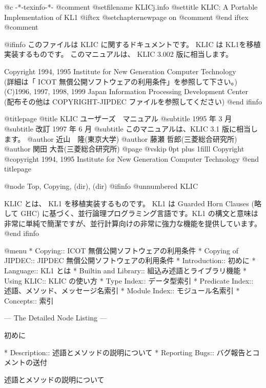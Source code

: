   @c -*-texinfo-*-
@comment %
@setfilename KLICj.info
@settitle KLIC: A Portable Implementation of KL1
@iftex
@setchapternewpage on
@comment %
@end iftex
@comment %

@ifinfo
このファイルは KLIC に関するドキュメントです。
KLIC は KL1を移植実装するものです。
このマニュアルは、 KLIC 3.002 版に相当します。

Copyright 1994, 1995 Institute for New Generation Computer Technology\\
(詳細は「 ICOT 無償公開ソフトウェアの利用条件」を参照して下さい。)\\
(C)1996, 1997, 1998, 1999 Japan Information Processing Development Center\\
(配布その他は COPYRIGHT-JIPDEC ファイルを参照してください)
@end ifinfo

@titlepage
@title KLIC ユーザーズ　マニュアル
@subtitle 1995 年 3 月
@subtitle 改訂 1997 年 6 月
@subtitle このマニュアルは、KLIC 3.1 版に相当します。
@author 近山　隆(東京大学)
@author 藤瀬 哲郎(三菱総合研究所)
@author 関田 大吾(三菱総合研究所)
@page
@vskip 0pt plus 1filll
Copyright @copyright{} 1994, 1995 Institute for New Generation Computer Technology
@end titlepage

@node Top, Copying, (dir), (dir)
@ifinfo
@unnumbered KLIC

KLIC とは、 KL1 を移植実装するものです。 KL1 は Guarded Horn Clauses 
(略して GHC) に基づく、並行論理プログラミング言語です。KL1 の構文と意味は
非常に単純で簡潔ですが、並行計算向けの非常に強力な機能を提供しています。
@end ifinfo

@menu
* Copying::                     ICOT 無償公開ソフトウェアの利用条件
* Copying of JIPDEC::           JIPDEC 無償公開ソフトウェアの利用条件
* Introduction::                初めに
* Language::                    KL1 とは
* Builtin and Library::         組込み述語とライブラリ機能
* Using KLIC::                  KLIC の使い方
* Type Index::                  データ型索引
* Predicate Index::             述語、メソッド、メッセージ名索引
* Module Index::                モジュール名索引
* Concepts::                    索引

 --- The Detailed Node Listing ---

初めに

* Description::                 述語とメソッドの説明について
* Reporting Bugs::              バグ報告とコメントの送付

述語とメソッドの説明について

